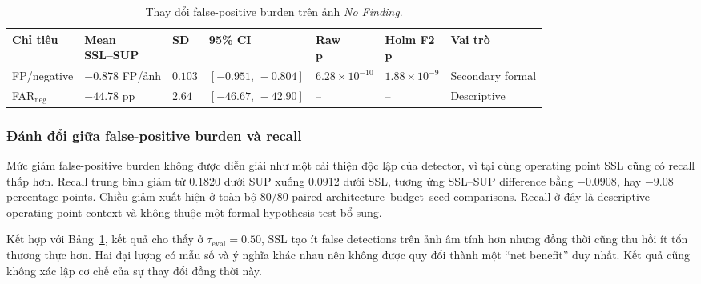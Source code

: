 \documentclass[pdflatex,sn-mathphys-num]{sn-jnl}%
\theoremstyle{thmstyleone}%
\theoremstyle{thmstyletwo}%
\theoremstyle{thmstylethree}%
\begin{document}
\begin{table}[htbp]
\centering
\caption{Thay đổi false-positive burden trên ảnh \textit{No Finding}.}
\label{tab:sq2_nofinding}

\small
\setlength{\tabcolsep}{2.5pt}
\renewcommand{\arraystretch}{1.10}

\begin{tabularx}{\textwidth}{
    >{\raggedright\arraybackslash}X
    >{\centering\arraybackslash}p{1.9cm}
    >{\centering\arraybackslash}p{0.9cm}
    >{\centering\arraybackslash}p{2.3cm}
    >{\centering\arraybackslash}p{1.9cm}
    >{\centering\arraybackslash}p{1.9cm}
    >{\raggedright\arraybackslash}X
}
\toprule

\textbf{Chỉ tiêu} &
\makecell{\textbf{Mean}\\\textbf{SSL--SUP}} &
\textbf{SD} &
\textbf{95\% CI} &
\makecell{\textbf{Raw}\\\(\boldsymbol{p}\)} &
\makecell{\textbf{Holm F2}\\\(\boldsymbol{p}\)} &
\textbf{Vai trò} \\

\midrule

FP/negative &
\(-0.878\) FP/ảnh &
\(0.103\) &
\([-0.951,\,-0.804]\) &
\(6.28\times10^{-10}\) &
\(1.88\times10^{-9}\) &
Secondary formal \\

FAR$_{\mathrm{neg}}$ &
\(-44.78\) pp &
\(2.64\) &
\([-46.67,\,-42.90]\) &
-- &
-- &
Descriptive \\

\bottomrule
\end{tabularx}

\end{table}

\subsubsection{Đánh đổi giữa false-positive burden và recall}

Mức giảm false-positive burden không được diễn giải như một cải thiện độc lập của detector, vì tại cùng operating point SSL cũng có recall thấp hơn. Recall trung bình giảm từ 0.1820 dưới SUP xuống 0.0912 dưới SSL, tương ứng SSL--SUP difference bằng $-0.0908$, hay $-9.08$ percentage points. Chiều giảm xuất hiện ở toàn bộ 80/80 paired architecture--budget--seed comparisons. Recall ở đây là descriptive operating-point context và không thuộc một formal hypothesis test bổ sung.

Kết hợp với Bảng~\ref{tab:sq2_nofinding}, kết quả cho thấy ở $\tau_{\mathrm{eval}}=0.50$, SSL tạo ít false detections trên ảnh âm tính hơn nhưng đồng thời cũng thu hồi ít tổn thương thực hơn. Hai đại lượng có mẫu số và ý nghĩa khác nhau nên không được quy đổi thành một ``net benefit'' duy nhất. Kết quả cũng không xác lập cơ chế của sự thay đổi đồng thời này.
\end{document}
